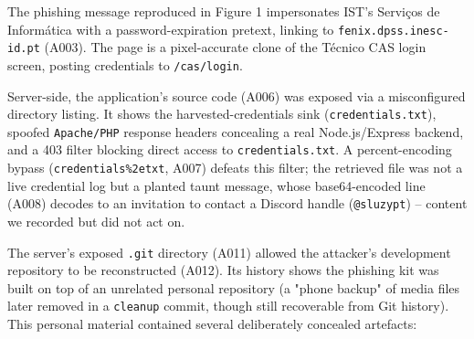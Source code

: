 \documentclass[11pt,a4paper,final,oneside]{article}
\begin{document}
%
%

The phishing message reproduced in Figure 1 impersonates IST's Serviços de Informática with a
password-expiration pretext, linking to \texttt{fenix.dpss.inesc-id.pt} (A003). The page is a
pixel-accurate clone of the Técnico CAS login screen, posting credentials to \texttt{/cas/login}.

Server-side, the application's source code (A006) was exposed via a misconfigured directory
listing. It shows the harvested-credentials sink (\texttt{credentials.txt}), spoofed
\texttt{Apache/PHP} response headers concealing a real Node.js/Express backend, and a 403 filter
blocking direct access to \texttt{credentials.txt}. A percent-encoding bypass
(\texttt{credentials\%2etxt}, A007) defeats this filter; the retrieved file was not a live
credential log but a planted taunt message, whose base64-encoded line (A008) decodes to an
invitation to contact a Discord handle (\texttt{@sluzypt}) -- content we recorded but did not act
on.

The server's exposed \texttt{.git} directory (A011) allowed the attacker's development
repository to be reconstructed (A012). Its history shows the phishing kit was built on top of an
unrelated personal repository (a "phone backup" of media files later removed in a
\texttt{cleanup} commit, though still recoverable from Git history). This personal material
contained several deliberately concealed artefacts:
\end{document}
